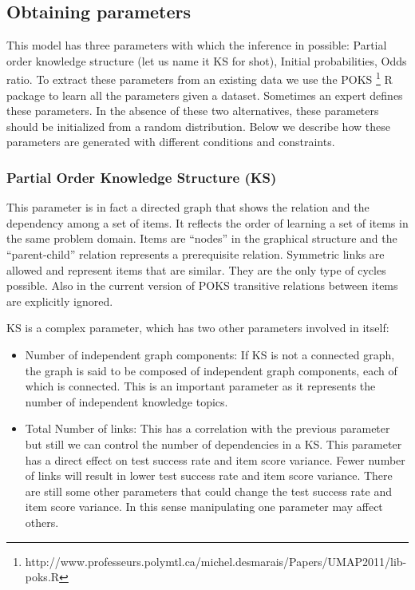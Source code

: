 \subsection{Obtaining parameters}
This model has three parameters with which the inference in possible: Partial order knowledge structure (let us name it KS for shot), Initial probabilities, Odds ratio. To extract these parameters from an existing data we use the POKS \footnote{http://www.professeurs.polymtl.ca/michel.desmarais/Papers/UMAP2011/lib-poks.R} R package to learn all the parameters given a dataset. Sometimes an expert defines these parameters. In the absence of these two alternatives, these parameters should be initialized from a random distribution. Below we describe how these parameters are generated with different conditions and constraints.

\subsubsection{Partial Order Knowledge Structure (KS)}
This parameter is in fact a directed graph that shows the relation and the dependency among a set of items. It reflects the order of learning a set of items in the same problem domain. Items are ``nodes'' in the graphical structure and the ``parent-child'' relation represents a prerequisite relation. Symmetric links are allowed and represent items that are similar. They are the only type of cycles possible. Also in the current version of POKS transitive relations between items are explicitly ignored. 

KS is a complex parameter, which has two other parameters involved in itself:
\begin{itemize}
\item Number of independent graph components: If KS is not a connected graph, the graph is said to be composed of independent graph components, each of which is connected. This is an important parameter as it represents the number of independent knowledge topics.
\item Total Number of links: This has a correlation with the previous parameter but still we can control the number of dependencies in a KS. This parameter has a direct effect on test success rate and item score variance. Fewer number of links will result in lower test success rate and item score variance. There are still some other parameters that could change the test success rate and item score variance. In this sense manipulating one parameter may affect others.
\end{itemize} 

